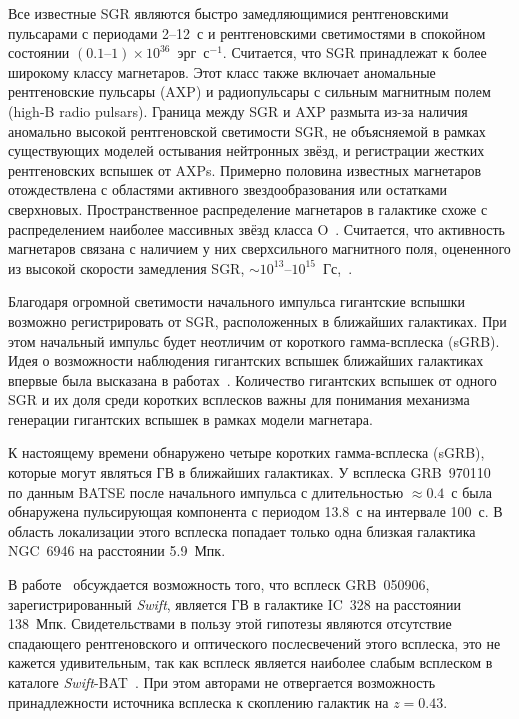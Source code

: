 Все известные SGR являются быстро замедляющимися рентгеновскими пульсарами 
с периодами 2--12~с и рентгеновскими светимостями в спокойном состоянии 
$(0.1\textrm{--}1)\times 10^{36}$~эрг~с$^{-1}$. Считается, что SGR принадлежат к 
более широкому классу магнетаров. Этот класс также включает аномальные 
рентгеновские пульсары (AXP) и радиопульсары с сильным магнитным полем (high-B radio pulsars).
Граница между SGR и AXP размыта из-за наличия аномально высокой рентгеновской светимости SGR,
не объясняемой в рамках существующих моделей остывания нейтронных звёзд, 
и регистрации жестких рентгеновских вспышек от AXPs. Примерно половина известных 
магнетаров отождествлена с областями активного звездообразования или остатками сверхновых.
Пространственное распределение магнетаров в галактике схоже с распределением 
наиболее массивных звёзд класса O~\citep{Olausen_Kaspi2014}. Считается, что 
активность магнетаров связана с наличием у них сверхсильного магнитного поля,
оцененного из высокой скорости замедления SGR, 
$\sim 10^{13}\textrm{--}10^{15}$~Гс,~\citep{Duncan_and_Thompson_1992ApJ,Thompson_and_Duncan_1995MNRAS,Thompson_and_Duncan_1996ApJ}.

Благодаря огромной светимости начального импульса гигантские вспышки возможно  
регистрировать от SGR, расположенных в ближайших галактиках. При этом начальный 
импульс будет неотличим от короткого гамма-всплеска (sGRB). Идея о возможности наблюдения 
гигантских вспышек ближайших галактиках впервые была высказана 
в работах~\citep{Mazets1981,Mazets1982}. Количество гигантских вспышек от одного 
SGR и их доля среди коротких всплесков важны для понимания механизма генерации 
гигантских вспышек в рамках модели магнетара.

К настоящему времени обнаружено четыре коротких гамма-всплеска (sGRB), которые могут 
являться ГВ в ближайших галактиках. У всплеска GRB~970110~\citep{Crider2006} 
по данным BATSE после начального импульса с длительностью $\approx 0.4$~с была 
обнаружена пульсирующая компонента с  периодом 13.8~с на интервале 100~с. В область 
локализации этого всплеска попадает только одна близкая галактика NGC~6946 
на расстоянии 5.9~Мпк. 

В работе~\citep{Levan2008} обсуждается возможность того, что всплеск GRB~050906, 
зарегистрированный \textit{Swift}, является ГВ в галактике 
IC~328 на расстоянии 138~Мпк. Свидетельствами в пользу этой гипотезы являются  
отсутствие спадающего рентгеновского и оптического послесвечений этого всплеска, 
это не кажется удивительным, так как всплеск является наиболее слабым всплеском 
в каталоге \textit{Swift}-BAT~\citep{Sakamoto2011ApJS}. При этом 
авторами не отвергается возможность принадлежности источника всплеска к скоплению 
галактик на $z = 0.43$. 

